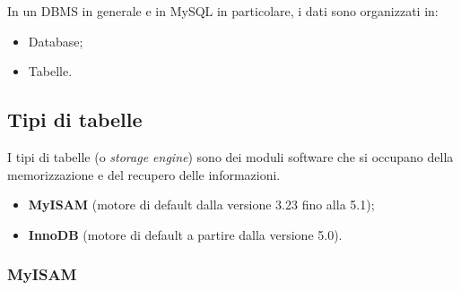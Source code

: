 In un DBMS in generale e in MySQL in particolare, i dati sono organizzati in:

\begin{itemize}

\item Database;
\item Tabelle.

\end{itemize}

\subsection{Tipi di tabelle}

I tipi di tabelle (o \textit{storage engine}) sono dei moduli software che si occupano della memorizzazione e del recupero delle informazioni.
 
\begin{itemize}

\item{\textbf{MyISAM}} (motore di default dalla versione 3.23 fino alla 5.1);
\item{\textbf{InnoDB}} (motore di default a partire dalla versione 5.0).

\end{itemize}

\subsubsection{MyISAM}

